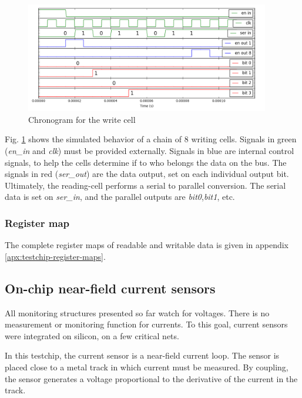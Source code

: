 \begin{figure}[!h]
  \centering
  \includegraphics[width=0.95\textwidth]{src/3/figures/curve_write_cell.png}
  \caption{Chronogram for the write cell}
  \label{fig:write-cell-curve}
\end{figure}

Fig. \ref{fig:write-cell-curve} shows the simulated behavior of a chain of 8 writing cells.
Signals in green (\textit{en\_in} and \textit{clk}) must be provided externally.
Signals in blue are internal control signals, to help the cells determine if to who belongs the data on the bus.
The signals in red (\textit{ser\_out}) are the data output, set on each individual output bit.
Ultimately, the reading-cell performs a serial to parallel conversion.
The serial data is set on \textit{ser\_in}, and the parallel outputs are \textit{bit0},\textit{bit1}, etc.

\subsubsection{Register map}

The complete register maps of readable and writable data is given in appendix \ref{apx:testchip-register-maps}.

\subsection{On-chip near-field current sensors}

All monitoring structures presented so far watch for voltages.
There is no measurement or monitoring function for currents.
To this goal, current sensors were integrated on silicon, on a few critical nets.

In this testchip, the current sensor is a near-field current loop.
The sensor is placed close to a metal track in which current must be measured.
By coupling, the sensor generates a voltage proportional to the derivative of the current in the track.

